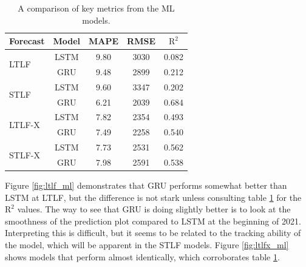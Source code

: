 \documentclass[12pt]{scrreprt}
\begin{document}
\begin{table}[h]
    \centering
    \begin{tabular}{|l | c c c c|}
        \hline
        Forecast & Model & MAPE & RMSE & $\textrm{R}^2$\\ 
        \hline
        \multirow{2}{*}{LTLF} & LSTM & 9.80 & 3030 & 0.082 \\
                              & GRU  & 9.48 & 2899 & 0.212 \\ 
        \hline
        \multirow{2}{*}{STLF} & LSTM & 9.60 & 3347 & 0.202 \\
                              & GRU  & 6.21 & 2039 & 0.684 \\ 
        \hline
        \multirow{2}{*}{LTLF-X} & LSTM & 7.82 & 2354 & 0.493 \\
                                & GRU  & 7.49 & 2258 & 0.540 \\ 
        \hline
        \multirow{2}{*}{STLF-X} & LSTM & 7.73 & 2531 & 0.562 \\
                                & GRU  & 7.98 & 2591 & 0.538 \\ 
        \hline
    \end{tabular}
    \caption{A comparison of key metrics from the ML models.}
    \label{tab:ml_metrics}
\end{table}

Figure \ref{fig:ltlf_ml} demonstrates that GRU performs somewhat better than LSTM at LTLF, but the difference is not stark unless consulting table \ref{tab:ml_metrics} for the $\textrm{R}^2$ values. The way to see that GRU is doing slightly better is to look at the smoothness of the prediction plot compared to LSTM at the beginning of 2021. Interpreting this is difficult, but it seems to be related to the tracking ability of the model, which will be apparent in the STLF models. Figure \ref{fig:ltlfx_ml} shows models that perform almost identically, which corroborates table \ref{tab:ml_metrics}.
\end{document}
